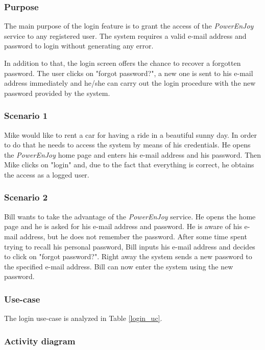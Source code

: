 \subsubsection{Purpose}
The main purpose of the login feature is to grant the access of the \emph{PowerEnJoy} service to any registered user. The system requires a valid e-mail address and password to login without generating any error.

In addition to that, the login screen offers the chance to recover a forgotten password. The user clicks on "forgot password?", a new one is sent to his e-mail address immediately and he/she can carry out the login procedure with the new password provided by the system.

\subsubsection{Scenario 1}
Mike would like to rent a car for having a ride in a beautiful sunny day. In order to do that he needs to access the system by means of his credentials. He opens the \emph{PowerEnJoy} home page and enters his e-mail address and his password. Then Mike clicks on "login" and, due to the fact that everything is correct, he obtains the access as a logged user.

\subsubsection{Scenario 2}
Bill wants to take the advantage of the \emph{PowerEnJoy} service. He opens the home page and he is asked for his e-mail address and password. He is aware of his e-mail address, but he does not remember the password. After some time spent trying to recall his personal password, Bill inputs his e-mail address and decides to click on "forgot password?". Right away the system sends a new password to the specified e-mail address. Bill can now enter the system using the new password.

\subsubsection{Use-case}

The login use-case is analyzed in Table \ref{login_uc}.

\subsubsection{Activity diagram}

